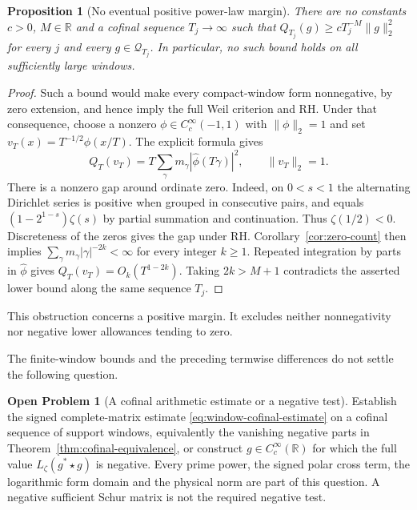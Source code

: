 \documentclass[11pt]{article}
\newtheorem{proposition}[theorem]{Proposition}
\theoremstyle{definition}
\newtheorem{problem}[theorem]{Open Problem}
\theoremstyle{remark}
\numberwithin{equation}{section}
\newcommand{\R}{\mathbb R}
\begin{document}


\begin{proposition}[No eventual positive power-law margin]
\label{prop:window-near-null}
There are no constants $c>0$, $M\in\R$ and a cofinal sequence
$T_j\to\infty$ such that
$Q_{T_j}(g)\ge cT_j^{-M}\|g\|_2^2$ for every $j$ and every
$g\in\mathcal Q_{T_j}$.  In particular, no such bound holds on
all sufficiently large windows.
\end{proposition}
\begin{proof}
Such a bound would make every compact-window form nonnegative,
by zero extension, and hence imply the full Weil criterion and RH.
Under that consequence, choose a nonzero
$\phi\in C_c^\infty(-1,1)$ with $\|\phi\|_2=1$ and set
$v_T(x)=T^{-1/2}\phi(x/T)$.  The explicit formula gives
\begin{equation}
 Q_T(v_T)=T\sum_\gamma m_\gamma
                    |\widehat\phi(T\gamma)|^2,
 \qquad \|v_T\|_2=1.
 \label{eq:window-near-null}
\end{equation}
There is a nonzero gap around ordinate zero.  Indeed, on
$0<s<1$ the alternating Dirichlet series is positive when grouped
in consecutive pairs, and equals $(1-2^{1-s})\zeta(s)$ by
partial summation and continuation.  Thus $\zeta(1/2)<0$.
Discreteness of the zeros gives the gap under RH.
Corollary~\ref{cor:zero-count} then implies
$\sum_\gamma m_\gamma|\gamma|^{-2k}<\infty$ for every integer
$k\ge1$.  Repeated integration by parts in $\widehat\phi$
gives $Q_T(v_T)=O_k(T^{1-2k})$.  Taking $2k>M+1$ contradicts
the asserted lower bound along the same sequence $T_j$.
\end{proof}

This obstruction concerns a positive margin.  It excludes neither
nonnegativity nor negative lower allowances tending to zero.


The finite-window bounds and the preceding termwise
differences do not settle the following question.

\begin{problem}[A cofinal arithmetic estimate or a negative test]
\label{prob:window-cofinal}
Establish the signed complete-matrix estimate
\eqref{eq:window-cofinal-estimate} on a cofinal sequence of support
windows, equivalently the vanishing negative parts in
Theorem~\ref{thm:cofinal-equivalence}, or construct
$g\in C_c^\infty(\R)$ for which the full value $L_\zeta(g^*\star g)$ is negative.  Every prime power,
the signed polar cross term, the logarithmic form domain and the
physical norm are part of this question.  A negative sufficient
Schur matrix is not the required negative test.
\end{problem}
\end{document}

